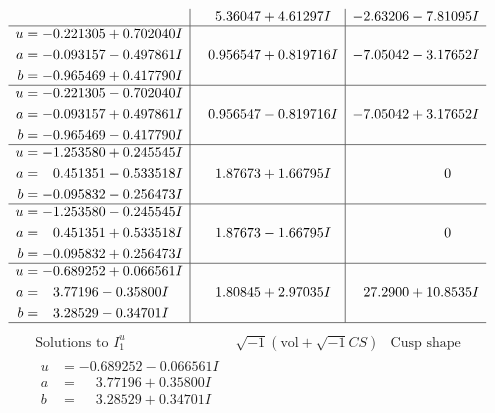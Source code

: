 \documentclass[1p]{elsarticle_modified}
\theoremstyle{definition}
\newcommand{\I}{\sqrt{-1}}
\begin{document}
$$\begin{array}{c|c|c}
 & \phantom{-}5.36047 + 4.61297 I & -2.63206 - 7.81095 I \\ \hline\begin{aligned}
u &= -0.221305 + 0.702040 I \\
a &= -0.093157 - 0.497861 I \\
b &= -0.965469 + 0.417790 I\end{aligned}
 & \phantom{-}0.956547 + 0.819716 I & -7.05042 - 3.17652 I \\ \hline\begin{aligned}
u &= -0.221305 - 0.702040 I \\
a &= -0.093157 + 0.497861 I \\
b &= -0.965469 - 0.417790 I\end{aligned}
 & \phantom{-}0.956547 - 0.819716 I & -7.05042 + 3.17652 I \\ \hline\begin{aligned}
u &= -1.253580 + 0.245545 I \\
a &= \phantom{-}0.451351 - 0.533518 I \\
b &= -0.095832 - 0.256473 I\end{aligned}
 & \phantom{-}1.87673 + 1.66795 I & \phantom{-0.000000 } 0 \\ \hline\begin{aligned}
u &= -1.253580 - 0.245545 I \\
a &= \phantom{-}0.451351 + 0.533518 I \\
b &= -0.095832 + 0.256473 I\end{aligned}
 & \phantom{-}1.87673 - 1.66795 I & \phantom{-0.000000 } 0 \\ \hline\begin{aligned}
u &= -0.689252 + 0.066561 I \\
a &= \phantom{-}3.77196 - 0.35800 I \\
b &= \phantom{-}3.28529 - 0.34701 I\end{aligned}
 & \phantom{-}1.80845 + 2.97035 I & \phantom{-}27.2900 + 10.8535 I\\
 \hline 
 \end{array}$$\newpage$$\begin{array}{c|c|c}  
\text{Solutions to }I^u_{1}& \I (\text{vol} + \sqrt{-1}CS) & \text{Cusp shape}\\
 \hline 
\begin{aligned}
u &= -0.689252 - 0.066561 I \\
a &= \phantom{-}3.77196 + 0.35800 I \\
b &= \phantom{-}3.28529 + 0.34701 I\end{aligned}

\end{array}$$
\end{document}
